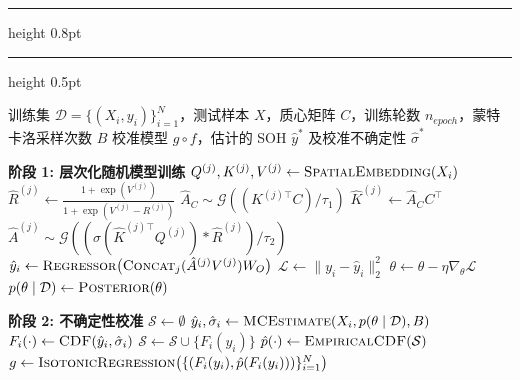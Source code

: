 \vspace{1em}
\hrule height 0.8pt
\vspace{3pt}
\begingroup
\captionsetup{singlelinecheck=false, justification=raggedright, font=normalsize}
\label{alg:hsstt}
\endgroup
\vspace{3pt}
\hrule height 0.5pt
\vspace{3pt}
\begingroup
\linespread{1.25}\selectfont
\begin{algorithmic}[1]
    \Require 训练集 $\mathcal{D}=\{(X_{i}, y_{i})\}_{i=1}^{N}$，测试样本 $X$，质心矩阵 $C$，训练轮数 $n_{epoch}$，蒙特卡洛采样次数 $B$
    \Ensure 校准模型 $g \circ f$，估计的 SOH $\hat{y}^{*}$ 及校准不确定性 $\hat{\sigma}^{*}$
    
    \Statex \textbf{阶段 1: 层次化随机模型训练}
     
            \State $Q^{(j)}, K^{(j)}, V^{(j)} \leftarrow \textsc{SpatialEmbedding}(X_{i})$ 
            \State $\hat{R}^{(j)} \leftarrow \frac{1+\exp(V^{(j)})}{1+\exp(V^{(j)}-R^{(j)})}$ 
            \State $\hat{A}_C \sim \mathcal{G}\left((K^{(j)\top} C) / \tau_1\right)$ 
            \State $\hat{K}^{(j)} \leftarrow \hat{A}_C C^\top$ 
            \State $\hat{A}^{(j)} \sim \mathcal{G}\left((\sigma(\hat{K}^{(j)\top} Q^{(j)}) * \hat{R}^{(j)}) / \tau_2\right)$ 
            \State $\hat{y}_{i} \leftarrow \textsc{Regressor}\big(\textsc{Concat}_{j}(\hat{A}^{(j)}V^{(j)})W_{O}\big)$ 
            \State $\mathcal{L} \leftarrow \lVert y_{i} - \hat{y}_{i} \rVert_2^2$ 
            \State $\theta \leftarrow \theta - \eta \nabla_{\theta}\mathcal{L}$ 
        \EndFor
    \EndFor
    \State $p(\theta \mid \mathcal{D}) \leftarrow \textsc{Posterior}(\theta)$ 
    
    \Statex \textbf{阶段 2: 不确定性校准}
    \State $\mathcal{S} \leftarrow \emptyset$
        \State $\hat{y}_i, \hat{\sigma}_i \leftarrow \textsc{MCEstimate}(X_i, p(\theta \mid \mathcal{D}), B)$ 
        \State $F_i(\cdot) \leftarrow \textsc{CDF}(\hat{y}_i, \hat{\sigma}_i)$ 
        \State $\mathcal{S} \leftarrow \mathcal{S} \cup \{F_i(y_i)\}$
    \EndFor
    \State $\hat{p}(\cdot) \leftarrow \textsc{EmpiricalCDF}(\mathcal{S})$ 
    \State $g \leftarrow \textsc{IsotonicRegression}\big(\{(F_i(y_i), \hat{p}(F_i(y_i)))\}_{i=1}^N\big)$ 
    

\end{algorithmic}
